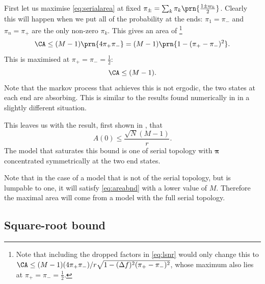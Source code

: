 \documentclass[12pt]{article}
\newcommand{\aav}[1]{\mathopen{}\left\llangle #1 \right\rrangle\mathclose{}}
\newcommand{\nnrm}[1]{\mathopen{}\left\lWavy #1 \right\rWavy\mathclose{}}
\newcommand{\eqm}{\pi}
\newcommand{\eq}{\boldsymbol{\eqm}}
\newcommand{\wm}{w}
\begin{document}
First let us maximise \cref{eq:serialarea} at fixed $\eqm_\pm = \sum_k \eqm_k \prn{\frac{1\pm\wm_k}{2}}$.
Clearly this will happen when we put all of the probability at the ends: $\eqm_1=\eqm_-$ and $\eqm_n=\eqm_+$ are the only non-zero $\eqm_k$.
This gives an area of
\footnote{Note that including the dropped factors in \cref{eq:lsnr} would only change this to \(\CA \leq (M-1)(4\eqm_+\eqm_-)/r\sqrt{1 - (\Delta f)^2(\eqm_+ - \eqm_-)^2}\), whose maximum also lies at \(\eqm_+=\eqm_-= \frac{1}{2}\).}
%
\begin{equation}\label{eq:serialextarea}
  \CA \leq (M-1) \prn{4\eqm_+\eqm_-} = (M-1)\prn{1 - (\eqm_+ - \eqm_-)^2}.
\end{equation}
%
This is maximised at \(\eqm_+=\eqm_-= \frac{1}{2}\):
%
\begin{equation}\label{eq:maxarea}
  \CA \leq (M-1).
\end{equation}
%
Note that the markov process that achieves this is not ergodic, the two states at each end are absorbing. 
This is similar to the results found numerically in \cite{Barrett2008discrete} in a slightly different situation.






This leaves us with the result, first shown in \cite{Lahiri2013synapse}, that
%
\begin{equation}\label{eq:areabnd}
  A(0) \leq \frac{\sqrt{N}(M-1)}{r}.
\end{equation}
%
The model that saturates this bound is one of serial topology with \(\eq\) concentrated symmetrically at the two end states.

Note that in the case of a model that is not of the serial topology, but is lumpable to one, 
it will satisfy \cref{eq:areabnd} with a lower value of \(M\).
Therefore the maximal area will come from a model with the full serial topology. 



\subsection{Square-root bound}\label{sec:sqrt}

\end{document}
